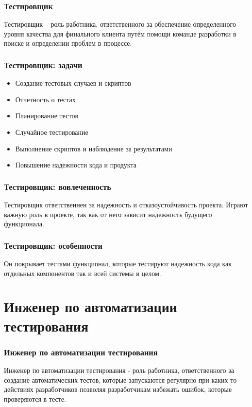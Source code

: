 \documentclass{../industrial-development}
\begin{document}
	\begin{frame} \frametitle{Тестировщик}
		\begin{block}{}
			\alert {Тестировщик} – роль работника, ответственного за обеспечение определенного уровня качества для финального клиента путём помощи команде разработки в поиске и определении проблем в процессе.
		\end{block}
		
	\end{frame}
	
	\begin{frame} \frametitle{Тестировщик: задачи}
		\begin{itemize}
			\item Создание тестовых случаев и скриптов
			\item Отчетность о тестах
			\item Планирование тестов
			\item Случайное тестирование
			\item Выполнение скриптов и наблюдение за результатами 
			\item Повышение надежности кода и продукта
		\end{itemize}
	\end{frame}

	\begin{frame} \frametitle{Тестировщик: вовлеченность}
		Тестировщик ответственнен за надежность и отказоустойчивость проекта. Играют важную роль в проекте, так как от него зависит надежность будущего функционала.
	\end{frame}
	
	\begin{frame} \frametitle{Тестировщик: особенности}
		Он покрывает тестами функционал, которые тестируют надежность кода как отдельных компонентов так и всей системы в целом. 
	\end{frame}
		
	\section{Инженер по автоматизации тестирования}
	
	\begin{frame} \frametitle{Инженер по автоматизации тестирования}
		\begin{block}{}
			\alert {Инженер по автоматизации тестирования} - роль работника, ответственного за создание автоматических тестов, которые запускаются регулярно при каких-то действиях разработчиков позволяя разработчикам избежать ошибок, которые проверяются в тесте.
		\end{block}
		
	\end{frame}
	
\end{document}
